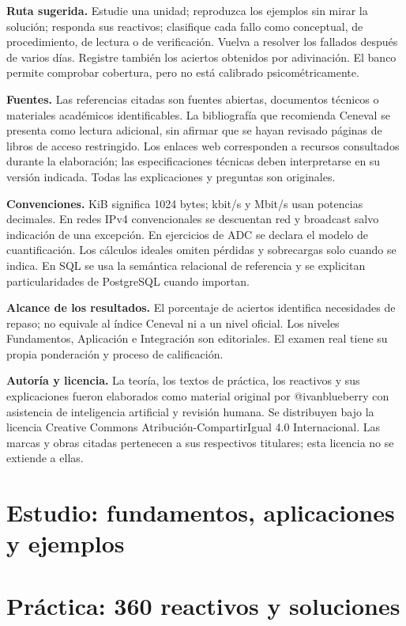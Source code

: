\documentclass[11pt,letterpaper,oneside]{book}
\begin{document}
\textbf{Ruta sugerida.} Estudie una unidad; reproduzca los ejemplos sin mirar la solución; responda sus reactivos; clasifique cada fallo como conceptual, de procedimiento, de lectura o de verificación. Vuelva a resolver los fallados después de varios días. Registre también los aciertos obtenidos por adivinación. El banco permite comprobar cobertura, pero no está calibrado psicométricamente.

\textbf{Fuentes.} Las referencias citadas son fuentes abiertas, documentos técnicos o materiales académicos identificables. La bibliografía que recomienda Ceneval se presenta como lectura adicional, sin afirmar que se hayan revisado páginas de libros de acceso restringido. Los enlaces web corresponden a recursos consultados durante la elaboración; las especificaciones técnicas deben interpretarse en su versión indicada. Todas las explicaciones y preguntas son originales.

\textbf{Convenciones.} KiB significa 1024 bytes; kbit/s y Mbit/s usan potencias decimales. En redes IPv4 convencionales se descuentan red y broadcast salvo indicación de una excepción. En ejercicios de ADC se declara el modelo de cuantificación. Los cálculos ideales omiten pérdidas y sobrecargas solo cuando se indica. En SQL se usa la semántica relacional de referencia y se explicitan particularidades de PostgreSQL cuando importan.

\textbf{Alcance de los resultados.} El porcentaje de aciertos identifica necesidades de repaso; no equivale al índice Ceneval ni a un nivel oficial. Los niveles Fundamentos, Aplicación e Integración son editoriales. El examen real tiene su propia ponderación y proceso de calificación.

\textbf{Autoría y licencia.} La teoría, los textos de práctica, los reactivos y sus explicaciones fueron elaborados como material original por @ivanblueberry con asistencia de inteligencia artificial y revisión humana. Se distribuyen bajo la licencia Creative Commons Atribución-CompartirIgual 4.0 Internacional. Las marcas y obras citadas pertenecen a sus respectivos titulares; esta licencia no se extiende a ellas.
\tableofcontents
\mainmatter
\part{Estudio: fundamentos, aplicaciones y ejemplos}






\part{Práctica: 360 reactivos y soluciones}
\end{document}
